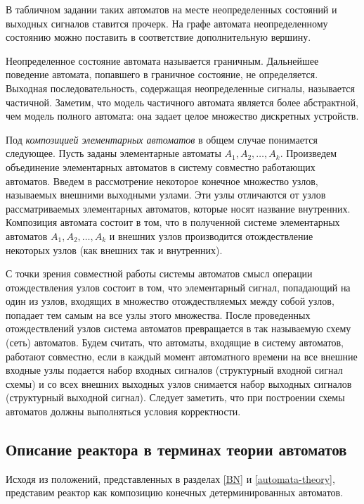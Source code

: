 В табличном задании таких автоматов на месте неопределенных состояний и выходных сигналов ставится прочерк. 
На графе автомата неопределенному состоянию можно поставить в соответствие дополнительную вершину.

Неопределенное состояние автомата называется граничным. 
Дальнейшее поведение автомата, попавшего в граничное состояние, не определяется. 
Выходная последовательность, содержащая неопределенные сигналы, называется частичной.
Заметим, что модель частичного автомата является более абстрактной, чем модель полного автомата: она задает целое множество дискретных устройств. \cite{TA-Syntes}



Под \textit{композицией элементарных автоматов} в общем случае понимается следующее.
Пусть заданы элементарные автоматы $A_1, A_2, \dots, A_k$.
Произведем объединение элементарных автоматов в систему совместно работающих автоматов. 
Введем в рассмотрение некоторое конечное множество узлов, называемых внешними выходными узлами. 
Эти узлы отличаются от узлов рассматриваемых элементарных автоматов, которые носят название внутренних.
Композиция автомата состоит в том, что в полученной системе элементарных автоматов $A_1, A_2, \dots, A_k$ и внешних узлов производится отождествление некоторых узлов (как внешних так и внутренних). 

С точки зрения совместной работы системы автоматов смысл операции отождествления узлов состоит в том, что элементарный сигнал, попадающий на один из узлов, входящих в множество отождествляемых между собой узлов, попадает тем самым на все узлы этого множества. 
После проведенных отождествлений узлов система автоматов превращается в так называемую схему (сеть) автоматов.
Будем считать, что автоматы, входящие в систему автоматов, работают совместно, если в каждый момент автоматного времени на все внешние входные узлы подается набор входных сигналов (структурный входной сигнал схемы) и со всех внешних выходных узлов снимается набор выходных сигналов (структурный выходной сигнал). 
Следует заметить, что при построении схемы автоматов должны выполняться условия корректности. 
\cite{TA-Lupal}
		
\subsection{Описание реактора в терминах теории автоматов}\label{TA-model}

Исходя из положений, представленных в разделах \ref{BN} и \ref{automata-theory}, представим реактор как композицию конечных детерминированных автоматов.

